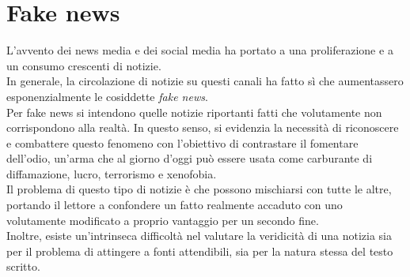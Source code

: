 \documentclass[12pt]{report}
\theoremstyle{definition}
\begin{document}
\section{Fake news} \label{fakenews}
L'avvento dei news media e dei social media ha portato a una proliferazione e a un consumo crescenti di notizie.
\\
In generale, la circolazione di notizie su questi canali ha fatto sì che aumentassero esponenzialmente le cosiddette \textit{fake news}.
\\
Per fake news si intendono quelle notizie riportanti fatti che volutamente non corrispondono alla realtà.
In questo senso, si evidenzia la necessità di riconoscere e combattere questo fenomeno con l'obiettivo di contrastare il fomentare dell'odio, un'arma che al giorno d'oggi può essere usata come carburante di diffamazione, lucro, terrorismo e xenofobia.
\\
Il problema di questo tipo di notizie è che possono mischiarsi con tutte le altre, portando il lettore a confondere un fatto realmente accaduto con uno volutamente modificato a proprio vantaggio per un secondo fine.
\\
Inoltre, esiste un'intrinseca difficoltà nel valutare la veridicità di una notizia sia per il problema di attingere a fonti attendibili, sia per la natura stessa del testo scritto.
\end{document}
